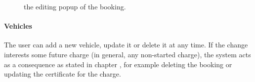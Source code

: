 \begin{figure}[h!]
    \centering
    \begin{minipage}{0.49\textwidth}
        \centering
    \end{minipage}
    \caption{the editing popup of the booking.}
\end{figure}

\pagebreak

\paragraph{Vehicles} The user can add a new vehicle, update it or delete it at any time. If the change interests some future charge (in general, any non-started charge), the system acts as a consequence as stated in chapter , for example deleting the booking or updating the certificate for the charge.

